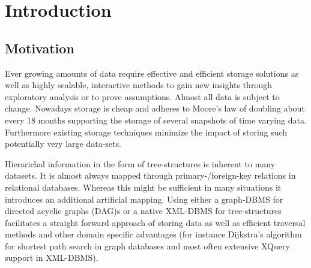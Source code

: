\section{Introduction}\label{sec::introduction}
\subsection{Motivation}
Ever growing amounts of data require effective and efficient storage solutions as well as highly scalable, interactive methods to gain new insights through exploratory analysis or to prove assumptions. Almost all data is subject to change. Nowadays storage is cheap and adheres to Moore's law\cite{MOORE} of doubling about every 18 months supporting the storage of several snapshots of time varying data. Furthermore existing storage techniques minimize the impact of storing such potentially very large data-sets.

Hierarichal information in the form of tree-structures is inherent to many datasets. It is almost always mapped through primary-/foreign-key relations in relational databases. Whereas this might be sufficient in many situations it introduces an additional artificial mapping. Using either a graph-DBMS for directed acyclic graphs (DAG)s or a native XML-DBMS for tree-structures facilitates a straight forward approach of storing data as well as efficient traversal methods and other domain specific advantages (for instance Dijkstra's algorithm for shortest path search in graph databases and most often extensive XQuery support in XML-DBMS).

